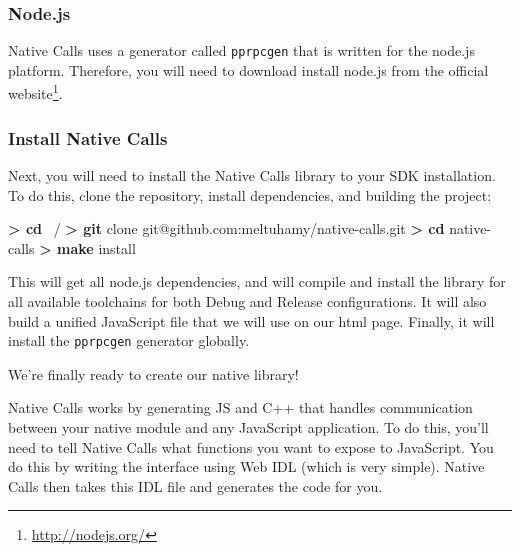 \documentclass[]{article}
\newenvironment{Shaded}{}{}
\newcommand{\KeywordTok}[1]{\textcolor[rgb]{0.00,0.44,0.13}{\textbf{{#1}}}}
\newcommand{\NormalTok}[1]{{#1}}
\begin{document}
\subsubsection{Node.js}\label{node.js}

Native Calls uses a generator called \texttt{pprpcgen} that is written
for the node.js platform. Therefore, you will need to download install
node.js from the official website\footnote{\url{http://nodejs.org/}}.

\subsubsection{Install Native Calls}\label{install-native-calls}

Next, you will need to install the Native Calls library to your SDK
installation. To do this, clone the repository, install dependencies,
and building the project:

\begin{Shaded}
\begin{Highlighting}[]
\KeywordTok{> cd} \NormalTok{~/}
\KeywordTok{> git} \NormalTok{clone git@github.com:meltuhamy/native-calls.git}
\KeywordTok{> cd} \NormalTok{native-calls}
\KeywordTok{> make} \NormalTok{install}
\end{Highlighting}
\end{Shaded}

This will get all node.js dependencies, and will compile and install the
library for all available toolchains for both Debug and Release
configurations. It will also build a unified JavaScript file that we
will use on our html page. Finally, it will install the
\texttt{pprpcgen} generator globally.

We're finally ready to create our native library!


Native Calls works by generating JS and C++ that handles communication
between your native module and any JavaScript application. To do this,
you'll need to tell Native Calls what functions you want to expose to
JavaScript. You do this by writing the interface using Web IDL (which is
very simple). Native Calls then takes this IDL file and generates the
code for you.
\end{document}
